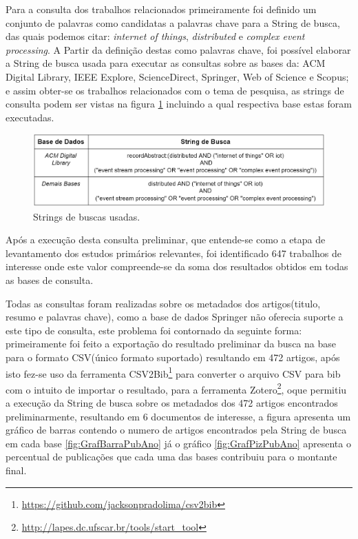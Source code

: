 \documentclass[tid,table]{texufpel} %
\begin{document}
Para a consulta dos trabalhos relacionados primeiramente foi definido um conjunto de palavras como candidatas a palavras chave para a String de busca, das quais podemos citar: \textit{internet of things}, \textit{distributed} e \textit{complex event processing}. A Partir da definição destas como palavras chave, foi possível elaborar a String de busca usada para executar as consultas sobre as bases da: ACM Digital Library, IEEE Explore, ScienceDirect, Springer, Web of Science e Scopus; e assim obter-se os trabalhos relacionados com o tema de pesquisa, as strings de consulta podem ser vistas na figura \ref{tab:stringBusca} incluindo a qual respectiva base estas foram executadas.



\begin{figure}[ht]
	\centering
	\includegraphics[width=1\textwidth]{imagens/tabela_string_busca.png}
	\caption{Strings de buscas usadas.}
	\label{tab:stringBusca}
\end{figure}

Após a execução desta consulta preliminar, que entende-se como a etapa de levantamento dos estudos primários relevantes, foi identificado 647 trabalhos de interesse onde este valor  compreende-se da soma dos resultados obtidos em todas as bases de consulta.

Todas as consultas foram realizadas sobre os metadados dos artigos(titulo, resumo e palavras chave), como a base de dados Springer não oferecia suporte a este tipo de consulta, este problema foi contornado da seguinte forma: primeiramente foi feito a exportação do resultado preliminar da busca na base para o formato CSV(único formato suportado) resultando em 472 artigos, após isto fez-se uso da ferramenta CSV2Bib\footnote{\url{https://github.com/jacksonpradolima/csv2bib}} para converter o arquivo CSV para bib com o intuito de importar o resultado, para a ferramenta Zotero\footnote{\url{http://lapes.dc.ufscar.br/tools/start_tool}},  oque permitiu a execução da String de busca sobre os metadados dos 472 artigos encontrados preliminarmente, resultando em 6 documentos de interesse, a figura apresenta um gráfico de barras contendo o numero de artigos encontrados pela String de busca em cada base \ref{fig:GrafBarraPubAno} já o gráfico \ref{fig:GrafPizPubAno} apresenta o percentual de publicações que cada uma das bases contribuiu para o montante final.
\end{document}

